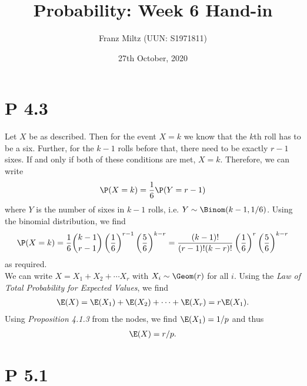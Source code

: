 \documentclass{article}
\begin{document}
\title{Probability: Week 6 Hand-in}
\author{Franz Miltz (UUN: S1971811)}
\date{27th October, 2020}
\maketitle


\section*{P 4.3}


Let $X$ be as described. Then for the event $X=k$ we know that
the $k$th roll has to be a six. Further, for the $k-1$ rolls before
that, there need to be exactly $r-1$ sixes. If and only if both of these
conditions are met, $X=k$. Therefore, we can write
\begin{align*}
	\P(X=k) = \frac{1}{6}\P(Y=r-1)
\end{align*}
where $Y$ is the number of sixes in $k-1$ rolls, i.e. $Y\sim\Binom(k-1,1/6)$. Using the binomial
distribution, we find
\begin{align*}
	\P(X=k) = \frac{1}{6}\binom{k-1}{r-1}\left(\frac{1}{6}\right)^ {r-1}
	\left(\frac{5}{6}\right)^{k-r}
	= \frac{(k-1)!}{(r-1)!(k-r)!}\left(\frac{1}{6}\right)^r\left(\frac{5}{6}\right)^{k-r}
\end{align*}
as required. \\
We can write $X=X_1+X_2+\cdots X_r$ with $X_i\sim \Geom(r)$ for all $i$.
Using the \emph{Law of Total Probability for Expected Values}, we find
\begin{align*}
	\E(X) = \E(X_1) + \E(X_2) + \cdots + \E(X_r) = r\E(X_1).
\end{align*}
Using \emph{Proposition 4.1.3} from the nodes, we find $\E(X_1) = 1/p$ and thus
\begin{align*}
	\E(X) = r/p.
\end{align*}


\section*{P 5.1}
\end{document}
